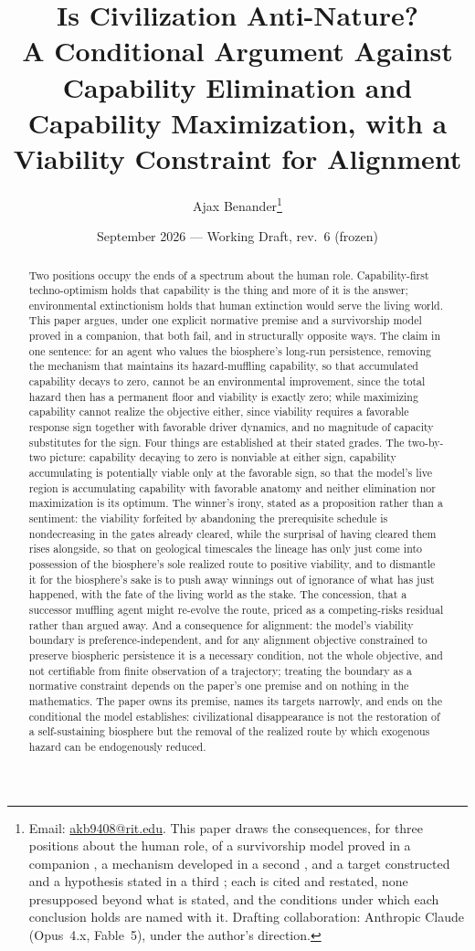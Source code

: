 \documentclass[11pt]{article}
\title{Is Civilization Anti-Nature?\\ \large A Conditional Argument Against Capability Elimination and Capability Maximization, with a Viability Constraint for Alignment}
\author{Ajax Benander\thanks{Email:
\href{mailto:akb9408@rit.edu}{akb9408@rit.edu}. This paper draws the
consequences, for three positions about the human role, of a survivorship
model proved in a companion \cite{SurvA}, a mechanism developed in a
second \cite{TechnoC}, and a target constructed and a hypothesis stated in
a third \cite{RouteWorld}; each is cited and restated, none presupposed
beyond what is stated, and the conditions under which each conclusion
holds are named with it. Drafting collaboration: Anthropic Claude
(Opus~4.x, Fable~5), under the author's direction.}}
\date{September 2026 --- Working Draft, rev.~6 (frozen)}
\theoremstyle{plain}
\theoremstyle{definition}
\theoremstyle{remark}
\begin{document}
\maketitle

\begin{abstract}
Two positions occupy the ends of a spectrum about the human role.
Capability-first techno-optimism holds that capability is the thing and
more of it is the answer; environmental extinctionism holds that human
extinction would serve the living world. This paper argues, under one
explicit normative premise and a survivorship model proved in a
companion, that both fail, and in structurally opposite ways. The claim
in one sentence: for an agent who values the biosphere's long-run
persistence, removing the mechanism that maintains its hazard-muffling capability,
so that accumulated capability decays to zero, cannot be an
environmental improvement, since the total hazard then has a permanent
floor and viability is exactly zero; while maximizing capability cannot realize the objective either,
since viability requires a favorable response sign together with
favorable driver dynamics, and no magnitude of capacity substitutes for
the sign. Four things are established at their stated grades. The
two-by-two picture: capability decaying to zero is nonviable at either
sign, capability accumulating is potentially viable only at the
favorable sign, so that the model's live region is accumulating capability with
favorable anatomy and neither elimination nor maximization is its
optimum. The winner's irony, stated as a proposition rather than a
sentiment: the viability forfeited by abandoning the prerequisite
schedule is nondecreasing in the gates already cleared, while the
surprisal of having cleared them rises alongside, so that on geological
timescales the lineage has only just come into possession of the
biosphere's sole realized route to positive viability, and to
dismantle it for the biosphere's sake is to push away winnings out of
ignorance of what has just happened, with the fate of the living world
as the stake. The concession, that a successor muffling agent might
re-evolve the route, priced as a competing-risks residual rather than
argued away. And a consequence for alignment: the model's viability boundary is
preference-independent, and for any alignment objective constrained to
preserve biospheric persistence it is a necessary condition, not the
whole objective, and not certifiable from finite observation of a
trajectory; treating the boundary as a normative constraint depends on
the paper's one premise and on nothing in the mathematics. The paper owns its premise, names its targets
narrowly, and ends on the conditional the model establishes:
civilizational disappearance is not the restoration of a self-sustaining
biosphere but the removal of the realized route by which exogenous
hazard can be endogenously reduced.
\end{abstract}
\end{document}
